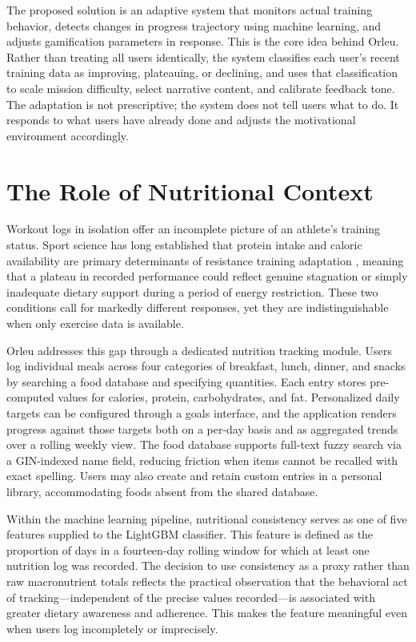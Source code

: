 \documentclass[12pt, a4paper]{report}
\begin{document}
The proposed solution is an adaptive system that monitors actual training behavior, detects changes in progress trajectory using machine learning, and adjusts gamification parameters in response. This is the core idea behind Orleu. Rather than treating all users identically, the system classifies each user's recent training data as improving, plateauing, or declining, and uses that classification to scale mission difficulty, select narrative content, and calibrate feedback tone. The adaptation is not prescriptive; the system does not tell users what to do. It responds to what users have already done and adjusts the motivational environment accordingly.

\section{The Role of Nutritional Context}

Workout logs in isolation offer an incomplete picture of an athlete's training status. Sport science has long established that protein intake and caloric availability are primary determinants of resistance training adaptation \citep{morton2018, helms2014}, meaning that a plateau in recorded performance could reflect genuine stagnation or simply inadequate dietary support during a period of energy restriction. These two conditions call for markedly different responses, yet they are indistinguishable when only exercise data is available.

Orleu addresses this gap through a dedicated nutrition tracking module. Users log individual meals across four categories of breakfast, lunch, dinner, and snacks by searching a food database and specifying quantities. Each entry stores pre-computed values for calories, protein, carbohydrates, and fat. Personalized daily targets can be configured through a goals interface, and the application renders progress against those targets both on a per-day basis and as aggregated trends over a rolling weekly view. The food database supports full-text fuzzy search via a GIN-indexed name field, reducing friction when items cannot be recalled with exact spelling. Users may also create and retain custom entries in a personal library, accommodating foods absent from the shared database.

Within the machine learning pipeline, nutritional consistency serves as one of five features supplied to the LightGBM classifier. This feature is defined as the proportion of days in a fourteen-day rolling window for which at least one nutrition log was recorded. The decision to use consistency as a proxy rather than raw macronutrient totals reflects the practical observation that the behavioral act of tracking---independent of the precise values recorded---is associated with greater dietary awareness and adherence. This makes the feature meaningful even when users log incompletely or imprecisely.
\end{document}
